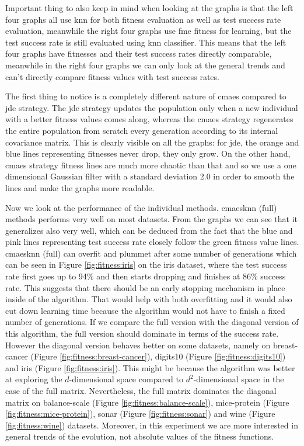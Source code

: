 \documentclass[12pt,a4paper]{report}
\begin{document}
Important thing to also keep in mind when looking at the graphs is that the left four graphs all use \ac{knn} for both fitness evaluation as well as test success rate evaluation, meanwhile the right four graphs use \ac{fme} fitness for learning, but the test success rate is still evaluated using \ac{knn} classifier. This means that the left four graphs have fitnesses and their test success rates directly comparable, meanwhile in the right four graphs we can only look at the general trends and can't directly compare fitness values with test success rates.

The first thing to notice is a completely different nature of \ac{cmaes} compared to \ac{jde} strategy. The \ac{jde} strategy updates the population only when a new individual with a better fitness values comes along, whereas the \ac{cmaes} strategy regenerates the entire population from scratch every generation according to its internal covariance matrix. This is clearly visible on all the graphs: for \ac{jde}, the orange and blue lines representing fitnesses never drop, they only grow. On the other hand, \ac{cmaes} strategy fitness lines are much more chaotic than that and so we use a one dimensional Gaussian filter with a standard deviation 2.0 in order to smooth the lines and make the graphs more readable. 

Now we look at the performance of the individual methods. \ac{cmaesknn} (full) methods performs very well on most datasets. From the graphs we can see that it generalizes also very well, which can be deduced from the fact that the blue and pink lines representing test success rate closely follow the green fitness value lines. \ac{cmaesknn} (full) can overfit and plummet after some number of generations which can be seen in Figure \ref{fig:fitness:iris} on the iris dataset, where the test success rate first goes up to 94\% and then starts dropping and finishes at 86\% success rate. This suggests that there should be an early stopping mechanism in place inside of the algorithm. That would help with both overfitting and it would also cut down learning time because the algorithm would not have to finish a fixed number of generations. If we compare the full version with the diagonal version of this algorithm, the full version should dominate in terms of the success rate. However the diagonal version behaves  better on some datasets, namely on breast-cancer (Figure \ref{fig:fitness:breast-cancer}), digits10 (Figure \ref{fig:fitness:digits10}) and iris (Figure \ref{fig:fitness:iris}). This might be because the algorithm was better at exploring the $d$-dimensional space compared to $d^2$-dimensional space in the case of the full matrix. Nevertheless, the full matrix dominates the diagonal matrix on balance-scale (Figure \ref{fig:fitness:balance-scale}), mice-protein (Figure \ref{fig:fitness:mice-protein}), sonar (Figure \ref{fig:fitness:sonar}) and wine (Figure \ref{fig:fitness:wine}) datasets. Moreover, in this experiment we are more interested in general trends of the evolution, not absolute values of the fitness functions.
\end{document}
